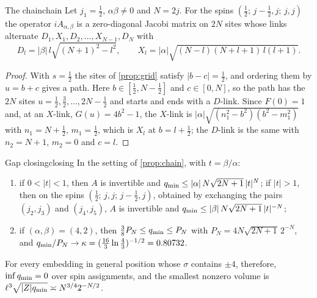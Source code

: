 \begin{proposition}{The chain}{chain}
Let $j_1=\frac12$, $\alpha\beta\ne0$ and $N=2j$. For the spins
$(\frac12;\,j-\frac12,j;\,j,j)$ the operator $iA_{\alpha,\beta}$ is a zero-diagonal
Jacobi matrix on $2N$ sites whose links alternate
$D_1,X_1,D_2,\dots,X_{N-1},D_N$ with
\[
  D_l=|\beta|\,l\sqrt{(N+1)^2-l^2},\qquad X_l=|\alpha|\sqrt{(N-l)(N+l+1)\,l(l+1)} .
\]
\end{proposition}

\begin{proof}
With $s=\frac12$ the sites of \cref{prop:grid} satisfy $|b-c|=\frac12$, and ordering
them by $u=b+c$ gives a path. Here $b\in[\frac12,N-\frac12]$ and $c\in[0,N]$, so the
path has the $2N$ sites $u=\frac12,\frac32,\dots,2N-\frac12$ and starts and ends with
a $D$-link. Since $F(0)=1$ and, at an $X$-link, $G(u)=4b^2-1$, the $X$-link is
$|\alpha|\sqrt{(n_1^2-b^2)(b^2-m_1^2)}$ with $n_1=N+\frac12$, $m_1=\frac12$, which
is $X_l$ at $b=l+\frac12$; the $D$-link is the same with $n_2=N+1$, $m_2=0$ and
$c=l$.
\end{proof}

\begin{theorem}{Gap closing}{closing}
In the setting of \cref{prop:chain}, with $t=\beta/\alpha$:
\begin{enumerate}
\item[(i)] if $0<|t|<1$, then $A$ is invertible and $q_{\min}\le|\alpha|\,N\sqrt{2N+1}\,|t|^N$;
  if $|t|>1$, then on the spins $(\frac12;\,j,j;\,j-\frac12,j)$, obtained by exchanging the
  pairs $(j_2,j_3)$ and $(j_4,j_5)$, $A$ is invertible and $q_{\min}\le|\beta|\,N\sqrt{2N+1}\,|t|^{-N}$;
\item[(ii)] if $(\alpha,\beta)=(4,2)$, then $\frac38P_N\le q_{\min}\le P_N$ with
  $P_N=4N\sqrt{2N+1}\,2^{-N}$, and $q_{\min}/P_N\to\kappa=(\frac{16}3\ln\frac43)^{-1/2}=0.80732$.
\end{enumerate}
For every embedding in general position whose $\sigma$ contains $\pm4$, therefore, $\inf q_{\min}=0$ over spin
assignments, and the smallest nonzero volume is $\ell^3\sqrt{|Z|q_{\min}}\asymp
N^{3/4}2^{-N/2}$.
\end{theorem}

